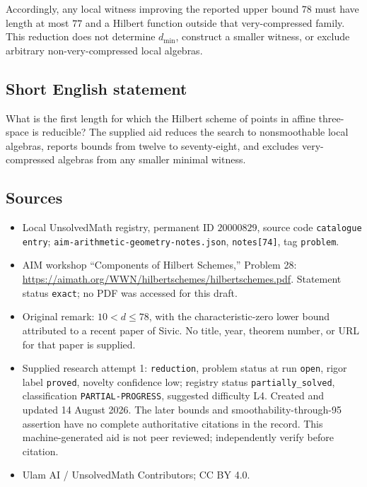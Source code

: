\documentclass[11pt]{article}
\begin{document}
Accordingly, any local witness improving the reported upper bound \(78\) must have length at most \(77\) and a Hilbert function outside that very-compressed family. This reduction does not determine \(d_{\min}\), construct a smaller witness, or exclude arbitrary non-very-compressed local algebras.
\subsection{Short English statement}
What is the first length for which the Hilbert scheme of points in affine three-space is reducible? The supplied aid reduces the search to nonsmoothable local algebras, reports bounds from twelve to seventy-eight, and excludes very-compressed algebras from any smaller minimal witness.
\subsection{Sources}
\begin{itemize}
\item Local UnsolvedMath registry, permanent ID \(20000829\), source code \texttt{catalogue entry}; \texttt{aim-arithmetic-geometry-notes.json}, \texttt{notes[74]}, tag \texttt{problem}.
\item AIM workshop ``Components of Hilbert Schemes,'' Problem 28: \url{https://aimath.org/WWN/hilbertschemes/hilbertschemes.pdf}. Statement status \texttt{exact}; no PDF was accessed for this draft.
\item Original remark: \(10<d\le78\), with the characteristic-zero lower bound attributed to a recent paper of Sivic. No title, year, theorem number, or URL for that paper is supplied.
\item Supplied research attempt 1: \texttt{reduction}, problem status at run \texttt{open}, rigor label \texttt{proved}, novelty confidence low; registry status \texttt{partially\_solved}, classification \texttt{PARTIAL-PROGRESS}, suggested difficulty L4. Created and updated 14 August 2026. The later bounds and smoothability-through-95 assertion have no complete authoritative citations in the record. This machine-generated aid is not peer reviewed; independently verify before citation.
\item Ulam AI / UnsolvedMath Contributors; CC BY 4.0.
\end{itemize}
\end{document}
